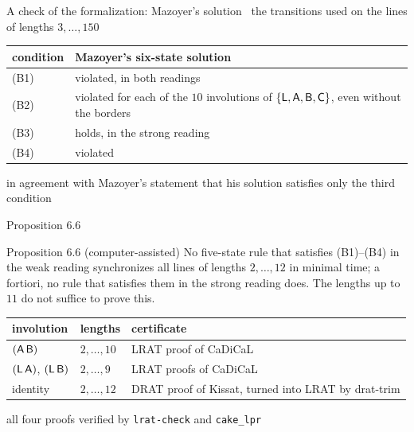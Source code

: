 \begin{frame}{A check of the formalization: Mazoyer's solution}
\ the transitions used on the lines of lengths $3,\dots,150$\\[2ex]
\renewcommand{\arraystretch}{1.3}
\begin{center}
\begin{tabular}{@{}l>{\raggedright\arraybackslash}p{10.5cm}@{}}
\toprule
condition & Mazoyer's six-state solution\\
\midrule
(B1) & violated, in both readings\\
(B2) & violated for each of the $10$ involutions of $\{\mathsf L,\mathsf A,\mathsf B,\mathsf C\}$, even without the borders\\
(B3) & holds, in the strong reading\\
(B4) & violated\\
\bottomrule
\end{tabular}
\end{center}
\vspace{1ex}
\small in agreement with Mazoyer's statement that his solution satisfies only the third condition
\end{frame}

\begin{frame}{Proposition 6.6}
\begin{statement}{Proposition 6.6 (computer-assisted)}
No five-state rule that satisfies (B1)--(B4) in the weak reading synchronizes all lines of lengths $2,\dots,12$ in minimal time; a fortiori, no rule that satisfies them in the strong reading does. The lengths up to $11$ do not suffice to prove this.
\end{statement}
\renewcommand{\arraystretch}{1.2}
\begin{center}\small
\begin{tabular}{@{}lll@{}}
\toprule
involution & lengths & certificate\\
\midrule
$(\mathsf A\,\mathsf B)$ & $2,\dots,10$ & LRAT proof of CaDiCaL\\
$(\mathsf L\,\mathsf A)$, $(\mathsf L\,\mathsf B)$ & $2,\dots,9$ & LRAT proofs of CaDiCaL\\
identity & $2,\dots,12$ & DRAT proof of Kissat, turned into LRAT by drat-trim\\
\bottomrule
\end{tabular}
\end{center}
\small all four proofs verified by \texttt{lrat-check} and \texttt{cake\_lpr} 
\end{frame}

